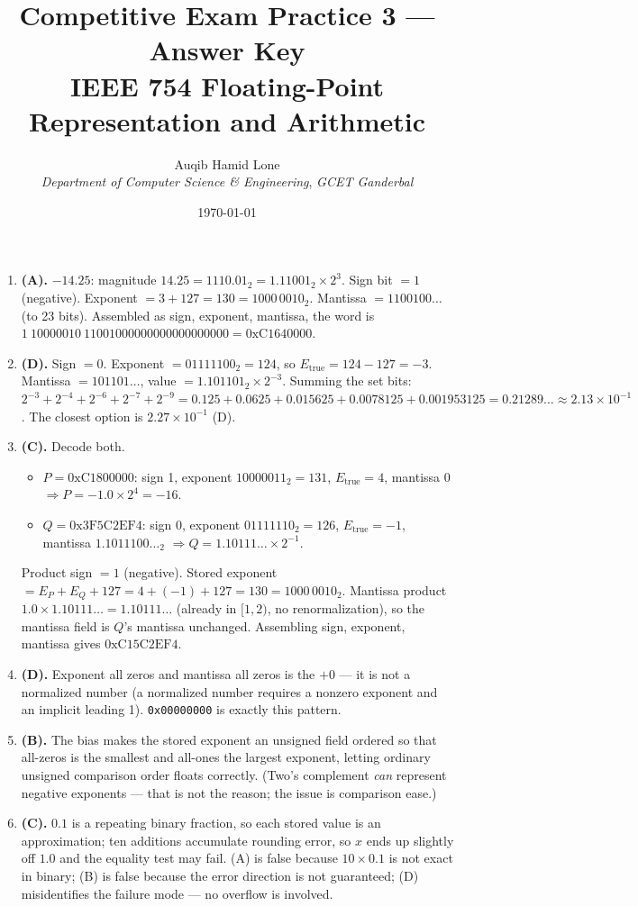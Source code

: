\documentclass[11pt]{article}
\title{Competitive Exam Practice 3 --- Answer Key\\\large IEEE 754 Floating-Point Representation and Arithmetic}
\author{Auqib Hamid Lone\\[0.3em]
  \emph{Department of Computer Science \& Engineering}, \emph{GCET Ganderbal}}
\date{\today}
\begin{document}
\maketitle

\begin{enumerate}
\item[\textbf{Q1}] \textbf{(A).} $-14.25$: magnitude $14.25 = 1110.01_2 = 1.11001_2 \times 2^3$. Sign bit $= 1$ (negative). Exponent $= 3 + 127 = 130 = 1000\,0010_2$. Mantissa $= 1100100\ldots$ (to 23 bits). Assembled as sign, exponent, mantissa, the word is $1\ 10000010\ 11001000000000000000000 = \text{0xC1640000}$.

\item[\textbf{Q2}] \textbf{(D).} Sign $= 0$. Exponent $= 01111100_2 = 124$, so $E_{\text{true}} = 124 - 127 = -3$. Mantissa $= 101101\ldots$, value $= 1.101101_2 \times 2^{-3}$. Summing the set bits: $2^{-3}+2^{-4}+2^{-6}+2^{-7}+2^{-9} = 0.125+0.0625+0.015625+0.0078125+0.001953125 = 0.21289\ldots \approx 2.13 \times 10^{-1}$. The closest option is $2.27 \times 10^{-1}$ (D).

\item[\textbf{Q3}] \textbf{(C).} Decode both.
\begin{itemize}
  \item $P = \text{0xC1800000}$: sign 1, exponent $10000011_2 = 131$, $E_{\text{true}} = 4$, mantissa 0 $\Rightarrow P = -1.0 \times 2^4 = -16$.
  \item $Q = \text{0x3F5C2EF4}$: sign 0, exponent $01111110_2 = 126$, $E_{\text{true}} = -1$, mantissa $1.1011100\ldots_2$ $\Rightarrow Q = 1.10111\ldots \times 2^{-1}$.
\end{itemize}
Product sign $= 1$ (negative). Stored exponent $= E_P + E_Q + 127 = 4 + (-1) + 127 = 130 = 1000\,0010_2$. Mantissa product $1.0 \times 1.10111\ldots = 1.10111\ldots$ (already in $[1,2)$, no renormalization), so the mantissa field is $Q$'s mantissa unchanged. Assembling sign, exponent, mantissa gives $\text{0xC15C2EF4}$.

\item[\textbf{Q4}] \textbf{(D).} Exponent all zeros and mantissa all zeros is the  $+0$ --- it is not a normalized number (a normalized number requires a nonzero exponent and an implicit leading 1). \texttt{0x00000000} is exactly this pattern.

\item[\textbf{Q5}] \textbf{(B).} The bias makes the stored exponent an unsigned field ordered so that all-zeros is the smallest and all-ones the largest exponent, letting ordinary unsigned comparison order floats correctly. (Two's complement \emph{can} represent negative exponents --- that is not the reason; the issue is comparison ease.)

\item[\textbf{Q6}] \textbf{(C).} $0.1$ is a repeating binary fraction, so each stored value is an approximation; ten additions accumulate rounding error, so $x$ ends up slightly off $1.0$ and the equality test may fail. (A) is false because $10 \times 0.1$ is not exact in binary; (B) is false because the error direction is not guaranteed; (D) misidentifies the failure mode --- no overflow is involved.
\end{enumerate}
\end{document}
